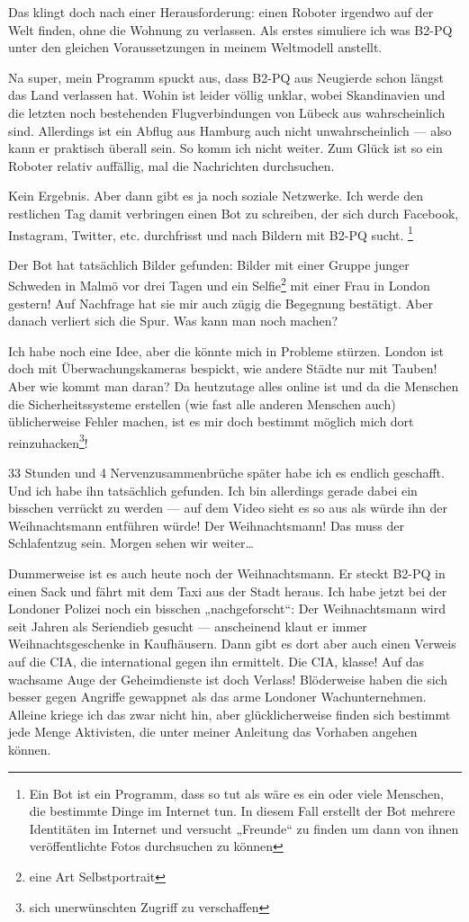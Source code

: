 Das klingt doch nach einer Herausforderung: einen Roboter irgendwo auf der Welt finden, ohne die Wohnung zu verlassen. Als erstes simuliere ich was B2-PQ unter den gleichen Voraussetzungen in meinem Weltmodell anstellt.

Na super, mein Programm spuckt aus, dass B2-PQ aus Neugierde schon längst das Land verlassen hat. Wohin ist leider völlig unklar, wobei Skandinavien und die letzten noch bestehenden Flugverbindungen von Lübeck aus wahrscheinlich sind. Allerdings ist ein Abflug aus Hamburg auch nicht unwahrscheinlich — also kann er praktisch überall sein. So komm ich nicht weiter. Zum Glück ist so ein Roboter relativ auffällig, mal die Nachrichten durchsuchen.

Kein Ergebnis. Aber dann gibt es ja noch soziale Netzwerke. Ich werde den restlichen Tag damit verbringen einen Bot zu schreiben, der sich durch Facebook, Instagram, Twitter, etc. durchfrisst und nach Bildern mit B2-PQ sucht.
\footnote{Ein Bot ist ein Programm, dass so tut als wäre es ein oder viele Menschen, die bestimmte Dinge im Internet tun. In diesem Fall erstellt der Bot mehrere Identitäten im Internet und versucht „Freunde“ zu finden um dann von ihnen veröffentlichte Fotos durchsuchen zu können}

Der Bot hat tatsächlich Bilder gefunden: Bilder mit einer Gruppe junger Schweden in Malmö vor drei Tagen und ein Selfie\footnote{eine Art Selbstportrait} mit einer Frau in London gestern! Auf Nachfrage hat sie mir auch zügig die Begegnung bestätigt. Aber danach verliert sich die Spur. Was kann man noch machen?

Ich habe noch eine Idee, aber die könnte mich in Probleme stürzen. London ist doch mit Überwachungskameras bespickt, wie andere Städte nur mit Tauben! Aber wie kommt man daran? Da heutzutage alles online ist und da die Menschen die Sicherheitssysteme erstellen (wie fast alle anderen Menschen auch) üblicherweise Fehler machen, ist es mir doch bestimmt möglich mich dort reinzuhacken\footnote{sich unerwünschten Zugriff zu verschaffen}!

33 Stunden und 4 Nervenzusammenbrüche später habe ich es endlich geschafft. Und ich habe ihn tatsächlich gefunden. Ich bin allerdings gerade dabei ein bisschen verrückt zu werden — auf dem Video sieht es so aus als würde ihn der Weihnachtsmann entführen würde! Der Weihnachtsmann! Das muss der Schlafentzug sein. Morgen sehen wir weiter…

Dummerweise ist es auch heute noch der Weihnachtsmann. Er steckt B2-PQ in einen Sack und fährt mit dem Taxi aus der Stadt heraus. Ich habe jetzt bei der Londoner Polizei noch ein bisschen „nachgeforscht“: Der Weihnachtsmann wird seit Jahren als Seriendieb gesucht — anscheinend klaut er immer Weihnachtsgeschenke in Kaufhäusern. Dann gibt es dort aber auch einen Verweis auf die CIA, die international gegen ihn ermittelt. Die CIA, klasse! Auf das wachsame Auge der Geheimdienste ist doch Verlass! Blöderweise haben die sich besser gegen Angriffe gewappnet als das arme Londoner Wachunternehmen. Alleine kriege ich das zwar nicht hin, aber glücklicherweise finden sich bestimmt jede Menge Aktivisten, die unter meiner Anleitung das Vorhaben angehen können.

